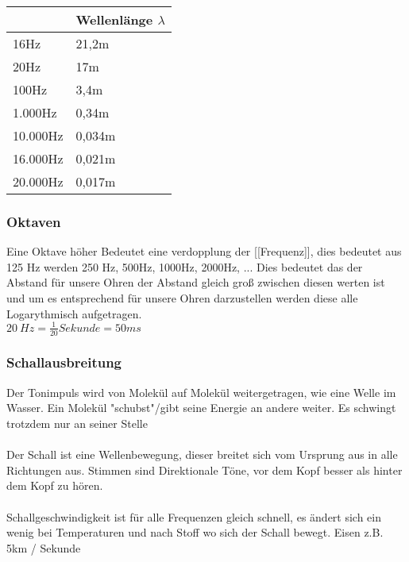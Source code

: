 \begin{table}[h]
\begin{center}
\begin{tabular}{l|l}
\hline
\rowcolor{YellowGreen!50!} \multicolumn{1}{|l|}{Frequenz} & \multicolumn{1}{l|}{Wellenlänge $\lambda$} \\ \hline
16Hz                           & 21,2m                                      \\
20Hz                           & 17m                                        \\
100Hz                          & 3,4m                                       \\
1.000Hz                        & 0,34m                                      \\
10.000Hz                       & 0,034m                                     \\
16.000Hz                       & 0,021m                                     \\
20.000Hz                       & 0,017m                                    
\end{tabular}
\end{center}
\end{table}
\newpage


    \subsubsection{Oktaven}
    Eine Oktave höher Bedeutet eine verdopplung der [[Frequenz]], dies bedeutet aus 125 Hz werden 250 Hz, 500Hz, 1000Hz, 2000Hz, ...
Dies bedeutet das der Abstand für unsere Ohren der Abstand gleich groß zwischen diesen werten ist und um es entsprechend für unsere Ohren darzustellen werden diese alle Logarythmisch aufgetragen. \\
$20~Hz = \frac{1}{20}Sekunde=50ms$


    \subsubsection{Schallausbreitung}
        Der Tonimpuls wird von Molekül auf Molekül weitergetragen, wie eine Welle im Wasser.  Ein Molekül "schubst"/gibt seine Energie an andere weiter. Es schwingt trotzdem nur an seiner Stelle\\~\\
Der Schall ist eine Wellenbewegung, dieser breitet sich vom Ursprung aus in alle Richtungen aus. Stimmen sind Direktionale Töne, vor dem Kopf besser als hinter dem Kopf zu hören. \\~\\
Schallgeschwindigkeit ist für alle Frequenzen gleich schnell, es ändert sich ein wenig bei Temperaturen und nach Stoff wo sich der Schall bewegt.
Eisen z.B. 5km / Sekunde

